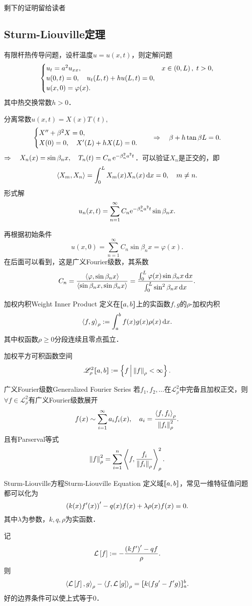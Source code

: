 	剩下的证明留给读者
\clearpage
\subsection{Sturm-Liouville定理}
\eg 有限杆热传导问题，设杆温度$u=u(x,t)$，则定解问题
\begin{align*}
	\begin{cases}
		u_t=a^2u_{xx},&x\in\left(0,L\right),\;t>0,\\
		u(0,t)=0,\quad u_t(L,t)+hu(L,t)=0,\\
		u(x,0)=\varphi(x).
	\end{cases}
\end{align*}
其中热交换常数$h>0$．

分离常数$u(x,t)=X(x)T(t),$
\begin{align*}
	\begin{cases}
		X''+\beta^2X=0, \\
		X(0)=0,\quad X'(L)+hX(L)=0.
	\end{cases}\quad\Rightarrow\quad\beta+h\tan\beta L=0.
\end{align*}
$\Rightarrow\quad X_n(x)=\sin\beta_nx,\quad T_n(t)=C_n\mathop{}\!\mathrm{e}^{-\beta_n^2a^2t}$．可以验证$X_n$是正交的，即
\[\left\langle X_m,X_n\right\rangle=\int_0^LX_m(x)X_n(x)\mathop{}\!\mathrm{d} x=0,\quad m\neq n.\]
形式解
\[u_n(x,t)=\sum_{n=1}^\infty C_n\mathrm e^{-\beta_n^2a^2t}\sin\beta_nx.\]

再根据初始条件
\[u(x,0)=\sum_{n=1}^\infty C_n\sin\beta_nx=\varphi(x).\]
在后面可以看到，这是广义Fourier级数，其系数
\[C_n=\frac{\left\langle \varphi,\sin\beta_nx\right\rangle}{\left\langle \sin\beta_nx,\sin\beta_nx\right\rangle}=\frac{\int_0^L\varphi(x)\sin\beta_nx\mathop{}\!\mathrm{d} x}{\int_0^L\sin^2\beta_nx\mathop{}\!\mathrm{d} x}.\]
\begin{definition}{加权内积}{Weight Inner Product}
	定义在$\lfloor\hspace{-4.7 pt}\lceil a,b\rceil\hspace{-4.7 pt}\rfloor$上的实函数$f,g$的$\rho$\;-\;加权内积
	\[\left\langle f,g\right\rangle_\rho:=\int_a^bf(x)g(x)\rho(x)\mathop{}\!\mathrm{d} x.\]
	其中权函数$\rho\geqslant 0$分段连续且零点孤立．

	加权平方可积函数空间
	\[\mathscr L_\rho^2\lfloor\hspace{-4.7 pt}\lceil a,b\rceil\hspace{-4.7 pt}\rfloor:=\left\{f\,\middle\vert\,\left\lVert f\right\rVert_\rho<\infty\right\}.\]
\end{definition}
\begin{theorem}{广义Fourier级数}{Generalized Fourier Series}
	若$f_1,f_2,\ldots$在$\mathscr L_\rho^2$中完备且加权正交，则$\forall f\in\mathscr L_\rho^2$有广义Fourier级数展开
	\[f(x)\sim\sum_{i=1}^\infty a_if_i(x),\quad a_i=\frac{\left\langle f,f_i\right\rangle_\rho}{\left\lVert f_i\right\rVert^2_\rho}.\]
	且有Parserval等式
	\[\left\lVert f\right\rVert_\rho^2=\sum_{i=1}^n\left\langle f,\frac{f_i}{\left\lVert f_i\right\rVert_\rho}\right\rangle_\rho^2.\]
\end{theorem}
\begin{definition}{Sturm-Liouville方程}{Sturm-Liouville Equation}
	定义域$\lfloor\hspace{-4.7 pt}\lceil a,b\rceil\hspace{-4.7 pt}\rfloor$，常见一维特征值问题都可以化为
	\[\left(k(x)f'(x)\right)'-q(x)f(x)+\lambda\rho(x)f(x)=0.\]
	其中$\lambda$为参数，$k,q,\rho$为实函数．

	记
	\[\mathcal L\left[f\right]:=-\frac{\left(kf'\right)'-qf}\rho.\]
	则
	\[\left\langle \mathcal L\left[f\right],g\right\rangle_\rho-\left\langle f,\mathcal L\left[g\right]\right\rangle_\rho=\lfloor\hspace{-4.7 pt}\lceil k(fg'-f'g)\rceil\hspace{-4.7 pt}\rfloor_a^b.\]
	好的边界条件可以使上式等于0．
\end{definition}
